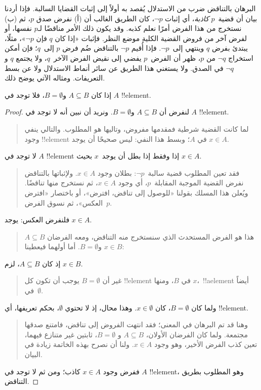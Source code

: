 \documentclass[../../../include/open-logic-section]{subfiles}
\begin{document}


البرهان بالتناقض ضرب من الاستدلال يُقصد به أولاً إلى إثبات القضايا
السالبة. فإذا أردنا بيان أن قضية~$p$ \emph{كاذبة}، أي إثبات
$\lnot p$، كان الطريق الغالب أن (أ) نفرض صدق $p$، ثم (ب) نستخرج من
هذا الفرض أمرًا نعلم كذبه. وقد يكون ذلك الأمر مناقضًا لـ$p$ نفسها، أو
لفرض آخر من فروض القضية الكلية موضع النظر. فإثبات «إذا كان $q$ فإن
$\lnot p$»، مثلًا، يبتدئ بفرض $q$ وينتهي إلى~$\lnot p$. فإذا أُقيم
$\lnot p$ بالتناقض ضُم فرض $p$ إلى~$q$؛ فإن أمكن استخراج $\lnot q$
من $p$، ظهر أن الفرض~$p$ يفضي إلى نقيض الفرض الآخر~$q$، ولا يجتمع
$q$ و$\lnot q$ في الصدق. ولا يستغني هذا الطريق عن سائر أنماط
الاستدلال ولا عن بسط التعريفات. ومثاله الآتي يوضح ذلك.

\begin{prop}
  إذا كان $A \subseteq B$ و$B = \emptyset$، فلا توجد في $A$
  !!{element}.
\end{prop}

\begin{proof}
  لنفرض أن $A \subseteq B$ و$B = \emptyset$. ونريد أن نبين أنه لا توجد
  في $A$ !!{element}.
  \begin{quote}
    لما كانت القضية شرطية فمقدمها مفروض، وتاليها هو المطلوب. والتالي
    ينفي وجود !!{element} في $A$؛ وبسط هذا النفي: ليس صحيحًا أن يوجد
    $x \in A$.
  \end{quote}
  لا توجد في $A$ !!{element} إذا وفقط إذا بطل أن يوجد~$x$
  بحيث $x \in A$.
  \begin{quote}
    فقد تعين المطلوب قضية سالبة~$\lnot p$: بطلان وجود $x \in A$.
    ولإثباتها بالتناقض نفرض القضية الموجبة المقابلة~$p$، أي وجود
    $x \in A$، ثم نستخرج منها تناقضًا. ويُعلن هذا المسلك بقولنا
    «للوصول إلى تناقض، افترض»، أو باختصار «افترض العكس»، ثم نسوق
    الفرض~$p$.
  \end{quote}
  فلنفرض العكس: يوجد $x \in A$.
  \begin{quote}
    هذا هو الفرض المستحدث الذي سنستخرج منه التناقض، ومعه الفرضان
    $A \subseteq B$ و$B = \emptyset$. أما أولهما فيعطينا
    $x \in B$:
  \end{quote}
  إذ كان $A \subseteq B$، لزم $x \in B$.
  \begin{quote}
    غير أن $B = \emptyset$ يوجب أن تكون كل !!{element} في $B$، ومنها
    $x$،~!!a{element} أيضاً في~$\emptyset$.
  \end{quote}
  ولما كان $B = \emptyset$، كان $x \in \emptyset$. وهذا محال، إذ لا
  تحتوي $\emptyset$، بحكم تعريفها، أي !!{element}.
  \begin{quote}
    وهنا قد تم البرهان في المعنى؛ فقد انتهت الفروض إلى تناقض، فامتنع
    صدقها مجتمعة. ولما كان الفرضان الأولان، $A \subseteq B$ و
    $B = \emptyset$، ثابتين غير متنازع فيهما، تعين كذب الفرض الأخير،
    وهو وجود $x \in A$. ولنا أن نصرح بهذه الخاتمة زيادة في البيان.
  \end{quote}
  ففرض وجود $x \in A$ كاذب؛ ومن ثم لا توجد في $A$ !!{element}، وهو
  المطلوب بطريق التناقض.
\end{proof}
\end{document}
